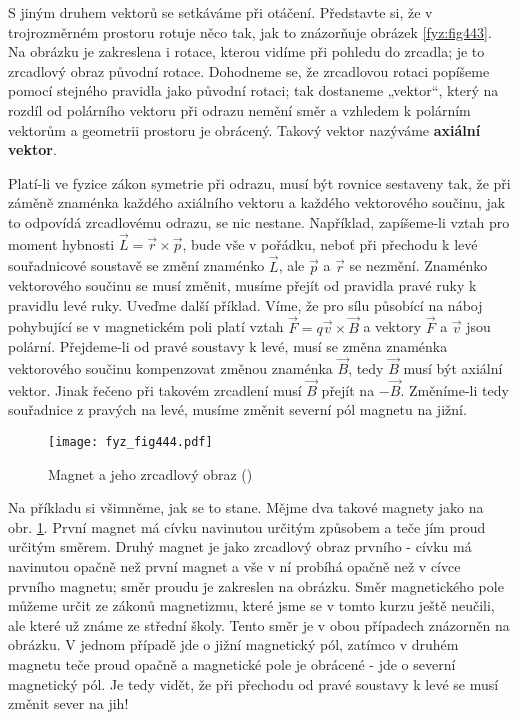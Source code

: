     S jiným druhem vektorů se setkáváme při otáčení. Představte si, že v trojrozměrném prostoru
    rotuje něco tak, jak to znázorňuje obrázek \ref{fyz:fig443}. Na obrázku je zakreslena i rotace,
    kterou vidíme při pohledu do zrcadla; je to zrcadlový obraz původní rotace. Dohodneme se, že
    zrcadlovou rotaci popíšeme pomocí stejného pravidla jako původní rotaci; tak dostaneme „vektor“,
    který na rozdíl od polárního vektoru při odrazu nemění směr a vzhledem k polárním vektorům a
    geometrii prostoru je obrácený. Takový vektor nazýváme \textbf{axiální vektor}.

    Platí-li ve fyzice zákon symetrie při odrazu, musí být rovnice sestaveny tak, že při záměně
    znaménka každého axiálního vektoru a každého vektorového součinu, jak to odpovídá zrcadlovému
    odrazu, se nic nestane. Například, zapíšeme-li vztah pro moment hybnosti \(\vec{L} =
    \vec{r}\times \vec{p}\), bude vše v pořádku, neboť při přechodu k levé souřadnicové soustavě se
    změní znaménko \(\vec{L}\), ale \(\vec{p}\) a \(\vec{r}\) se nezmění. Znaménko vektorového
    součinu se musí změnit, musíme přejít od pravidla pravé ruky k pravidlu levé ruky. Uveďme další
    příklad. Víme, že pro sílu působící na náboj pohybující se v magnetickém poli platí vztah
    \(\vec{F} = q \vec{v}\times\vec{B}\) a vektory \(\vec{F}\) a \(\vec{v}\) jsou polární.
    Přejdeme-li od pravé soustavy k levé, musí se změna znaménka vektorového součinu kompenzovat
    změnou znaménka \(\vec{B}\), tedy \(\vec{B}\) musí být axiální vektor. Jinak řečeno při takovém
    zrcadlení musí \(\vec{B}\) přejít na \(-\vec{B}\). Změníme-li tedy souřadnice z pravých na levé,
    musíme změnit severní pól magnetu na jižní.

    \begin{figure}[ht!] %
      \centering
      \texttt{[image: fyz\_fig444.pdf]}
      \caption{Magnet a jeho zrcadlový obraz (\cite[s.~707]{Feynman01})}
      \label{fyz:fig444}
    \end{figure}

    Na příkladu si všimněme, jak se to stane. Mějme dva takové magnety jako na obr.
    \ref{fyz:fig444}. První magnet má cívku navinutou určitým způsobem a teče jím proud určitým
    směrem. Druhý magnet je jako zrcadlový obraz prvního - cívku má navinutou opačně než první
    magnet a vše v ní probíhá opačně než v cívce prvního magnetu; směr proudu je zakreslen na
    obrázku. Směr magnetického pole můžeme určit ze zákonů magnetizmu, které jsme se v tomto kurzu
    ještě neučili, ale které už známe ze střední školy. Tento směr je v obou případech znázorněn na
    obrázku. V jednom případě jde o jižní magnetický pól, zatímco v druhém magnetu teče proud opačně
    a magnetické pole je obrácené - jde o severní magnetický pól. Je tedy vidět, že při přechodu od
    pravé soustavy k levé se musí změnit sever na jih!

